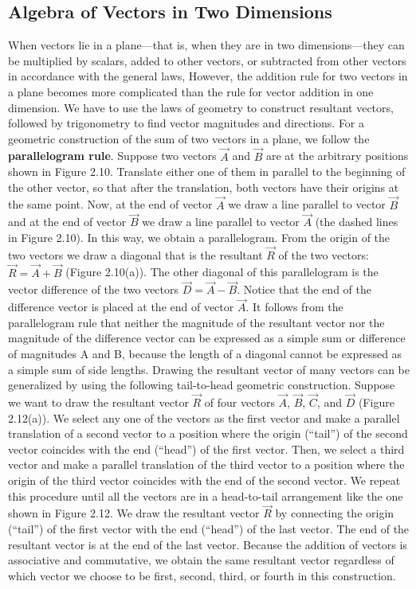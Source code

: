 \documentclass{report}
\begin{document}
    \bigbreak \noindent 
    \subsection{Algebra of Vectors in Two Dimensions}
    \bigbreak \noindent 
    When vectors lie in a plane—that is, when they are in two dimensions—they can be multiplied by scalars, added to other vectors, or subtracted from other vectors in accordance with the general laws, However, the addition rule for two vectors in a plane becomes more complicated than the rule for vector addition in one dimension. We have to use the laws of geometry to construct resultant vectors, followed by trigonometry to find vector magnitudes and directions. 
    \bigbreak \noindent 
    For a geometric construction of the sum of two vectors in a plane, we follow the \textbf{parallelogram rule}. Suppose two vectors $\vec{A}$ and $\vec{B}$ are at the arbitrary positions shown in Figure 2.10. Translate either one of them in parallel to the beginning of the other vector, so that after the translation, both vectors have their origins at the same point. Now, at the end of vector $\vec{A}$ we draw a line parallel to vector $\vec{B}$ and at the end of vector $\vec{B}$ we draw a line parallel to vector $\vec{A}$ (the dashed lines in Figure 2.10). In this way, we obtain a parallelogram. From the origin of the two vectors we draw a diagonal that is the resultant $\vec{R}$ of the two vectors: $\vec{R} = \vec{A} + \vec{B}$ (Figure 2.10(a)). The other diagonal of this parallelogram is the vector difference of the two vectors $\vec{D} = \vec{A} - \vec{B}$. Notice that the end of the difference vector is placed at the end of vector $\vec{A}$.
    \bigbreak \noindent 
    \bigbreak \noindent 
    It follows from the parallelogram rule that neither the magnitude of the resultant vector nor the magnitude of the difference vector can be expressed as a simple sum or difference of magnitudes A and B, because the length of a diagonal cannot be expressed as a simple sum of side lengths.
    \bigbreak \noindent 
    Drawing the resultant vector of many vectors can be generalized by using the following tail-to-head geometric construction. Suppose we want to draw the resultant vector $\vec{R}$ of four vectors $\vec{A}$, $\vec{B}$, $\vec{C}$, and $\vec{D}$ (Figure 2.12(a)). We select any one of the vectors as the first vector and make a parallel translation of a second vector to a position where the origin (“tail”) of the second vector coincides with the end (“head”) of the first vector. Then, we select a third vector and make a parallel translation of the third vector to a position where the origin of the third vector coincides with the end of the second vector. We repeat this procedure until all the vectors are in a head-to-tail arrangement like the one shown in Figure 2.12. We draw the resultant vector $\vec{R}$ by connecting the origin (“tail”) of the first vector with the end (“head”) of the last vector. The end of the resultant vector is at the end of the last vector. Because the addition of vectors is associative and commutative, we obtain the same resultant vector regardless of which vector we choose to be first, second, third, or fourth in this construction.
\end{document}
